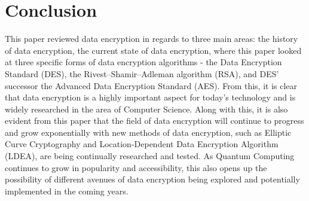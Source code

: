 \documentclass[journal]{IEEEtran}
\begin{document}
\section{\textbf{Conclusion}}
This paper reviewed data encryption in regards to three main areas: the history of data encryption, the current state of data encryption, where this paper looked at three specific forms of data encryption algorithms - the Data Encryption Standard (DES), the Rivest–Shamir–Adleman algorithm (RSA), and DES' successor the Advanced Data Encryption Standard (AES). From this, it is clear that data encryption is a highly important aspect for today's technology and is widely researched in the area of Computer Science. Along with this, it is also evident from this paper that the field of data encryption will continue to progress and grow exponentially with new methods of data encryption, such as Elliptic Curve Cryptography and Location-Dependent Data Encryption Algorithm (LDEA), are being continually researched and tested. As Quantum Computing continues to grow in popularity and accessibility, this also opens up the possibility of different avenues of data encryption being explored and potentially implemented in the coming years.

\bigskip

\printbibliography[title={References}]
\cite{des}
\cite{des_past&future}
\cite{des_cryptanalysis}
\cite{des_overview}
\cite{des_cracked}
\cite{aes}
\cite{aes_improvement}
\cite{rijndael_cryptanalysis}
\cite{aes_rijndael_length}
\cite{rsa}
\cite{rsa_cryptanalysis}
\cite{encryption_study}
\cite{prime_factorization}
\cite{block_cipher}
\cite{asymm_symm}
\cite{encryption_today}
\cite{shift_row}
\cite{encryption_research}
\cite{new_encryption_mobile}
\cite{quantum_computing_encryption}
\cite{encryption_mobile_node}
\cite{ecc}
\end{document}
